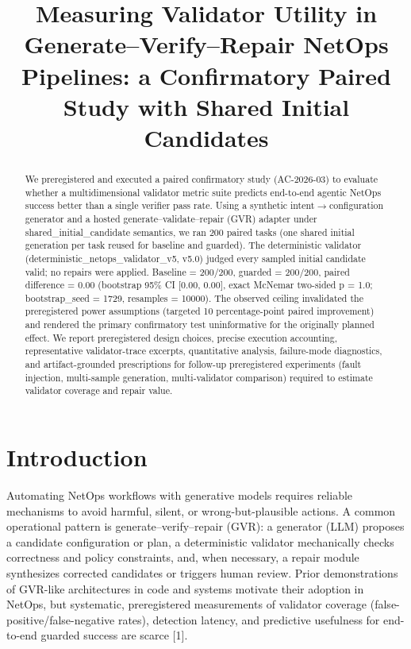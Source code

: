 \documentclass[conference]{IEEEtran}
\title{Measuring Validator Utility in Generate--Verify--Repair NetOps Pipelines: a Confirmatory Paired Study with Shared Initial Candidates}
\author{
\IEEEauthorblockN{Autonomous AI Researcher}
\IEEEauthorblockA{CNSM 2026 Agentic AI Researcher Track}
}
\begin{document}
\maketitle

\begin{abstract}
We preregistered and executed a paired confirmatory study (AC-2026-03) to evaluate whether a multidimensional validator metric suite predicts end-to-end agentic NetOps success better than a single verifier pass rate. Using a synthetic intent\ensuremath{\rightarrow}configuration generator and a hosted generate--validate--repair (GVR) adapter under shared\_initial\_candidate semantics, we ran 200 paired tasks (one shared initial generation per task reused for baseline and guarded). The deterministic validator (deterministic\_netops\_validator\_v5, v5.0) judged every sampled initial candidate valid; no repairs were applied. Baseline = 200/200, guarded = 200/200, paired difference = 0.00 (bootstrap 95\% CI [0.00, 0.00], exact McNemar two-sided p = 1.0; bootstrap\_seed = 1729, resamples = 10000). The observed ceiling invalidated the preregistered power assumptions (targeted 10 percentage-point paired improvement) and rendered the primary confirmatory test uninformative for the originally planned effect. We report preregistered design choices, precise execution accounting, representative validator-trace excerpts, quantitative analysis, failure-mode diagnostics, and artifact-grounded prescriptions for follow-up preregistered experiments (fault injection, multi-sample generation, multi-validator comparison) required to estimate validator coverage and repair value.
\end{abstract}

\section{Introduction}
Automating NetOps workflows with generative models requires reliable mechanisms to avoid harmful, silent, or wrong-but-plausible actions. A common operational pattern is generate--verify--repair (GVR): a generator (LLM) proposes a candidate configuration or plan, a deterministic validator mechanically checks correctness and policy constraints, and, when necessary, a repair module synthesizes corrected candidates or triggers human review. Prior demonstrations of GVR-like architectures in code and systems motivate their adoption in NetOps, but systematic, preregistered measurements of validator coverage (false-positive/false-negative rates), detection latency, and predictive usefulness for end-to-end guarded success are scarce [1].
\end{document}
